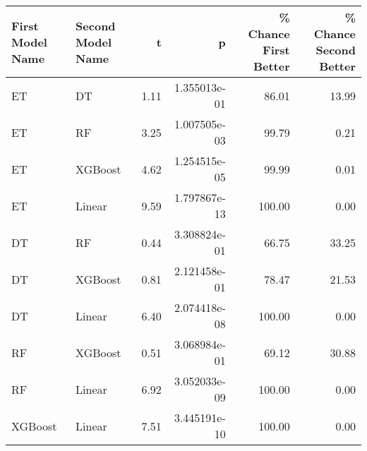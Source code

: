 \begin{tabular}{llrrrr}
\toprule
First Model Name & Second Model Name &    t &            p &  \% Chance First Better &  \% Chance Second Better \\
\midrule
              ET &                DT & 1.11 & 1.355013e-01 &                  86.01 &                   13.99 \\
              ET &                RF & 3.25 & 1.007505e-03 &                  99.79 &                    0.21 \\
              ET &           XGBoost & 4.62 & 1.254515e-05 &                  99.99 &                    0.01 \\
              ET &            Linear & 9.59 & 1.797867e-13 &                 100.00 &                    0.00 \\
              DT &                RF & 0.44 & 3.308824e-01 &                  66.75 &                   33.25 \\
              DT &           XGBoost & 0.81 & 2.121458e-01 &                  78.47 &                   21.53 \\
              DT &            Linear & 6.40 & 2.074418e-08 &                 100.00 &                    0.00 \\
              RF &           XGBoost & 0.51 & 3.068984e-01 &                  69.12 &                   30.88 \\
              RF &            Linear & 6.92 & 3.052033e-09 &                 100.00 &                    0.00 \\
         XGBoost &            Linear & 7.51 & 3.445191e-10 &                 100.00 &                    0.00 \\
\bottomrule
\end{tabular}

